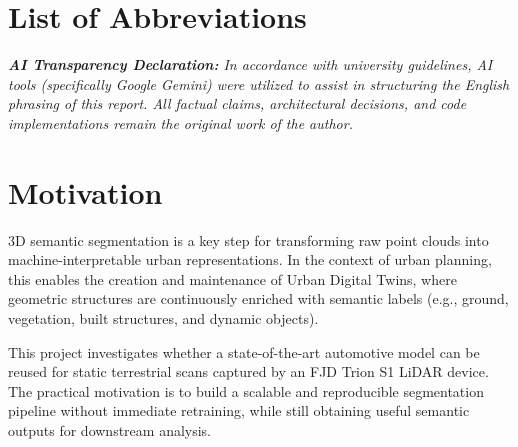 \documentclass[12pt, a4paper]{report}
\begin{document}
\tableofcontents
\newpage

\listoffigures
{}
\newpage

\chapter*{List of Abbreviations}
\begin{acronym}[SLAM] %
\end{acronym}
\newpage

\noindent\textit{\textbf{\ac{AI} Transparency Declaration:} In accordance with university guidelines, AI tools (specifically Google Gemini) were utilized to assist in structuring the English phrasing of this report. All factual claims, architectural decisions, and code implementations remain the original work of the author.}

\chapter{Motivation}
3D semantic segmentation is a key step for transforming raw point clouds into machine-interpretable urban representations. In the context of urban planning, this enables the creation and maintenance of Urban Digital Twins, where geometric structures are continuously enriched with semantic labels (e.g., ground, vegetation, built structures, and dynamic objects).

This project investigates whether a state-of-the-art automotive model can be reused for static terrestrial scans captured by an FJD Trion S1 LiDAR device. The practical motivation is to build a scalable and reproducible segmentation pipeline without immediate retraining, while still obtaining useful semantic outputs for downstream analysis.
\end{document}
